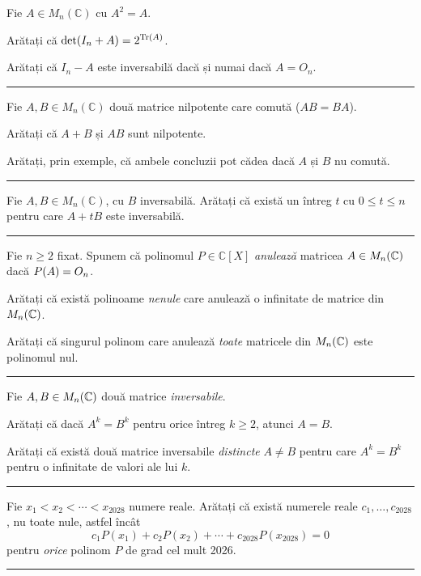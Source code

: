 Fie $A\in M_n(\mathbb{C})$ cu $A^2=A$.
\begin{parti}
  \item Arătați că $\det(I_n+A)=2^{\operatorname{Tr}(A)}$.
  \item Arătați că $I_n-A$ este inversabilă dacă și numai dacă $A=O_n$.
\end{parti}
\vspace{1mm}\hrule

Fie $A,B\in M_n(\mathbb{C})$ două matrice nilpotente care comută ($AB=BA$).
\begin{parti}
  \item Arătați că $A+B$ și $AB$ sunt nilpotente.
  \item Arătați, prin exemple, că ambele concluzii pot cădea dacă $A$ și $B$ nu comută.
\end{parti}
\vspace{1mm}\hrule

Fie $A,B\in M_n(\mathbb{C})$, cu $B$ inversabilă. Arătați că există un întreg $t$ cu $0\le t\le n$ pentru care $A+tB$ este inversabilă.
\vspace{1mm}\hrule

Fie $n\ge2$ fixat. Spunem că polinomul $P\in\mathbb{C}[X]$ \emph{anulează} matricea $A\in M_n(\mathbb{C})$ dacă $P(A)=O_n$.
\begin{parti}
  \item Arătați că există polinoame \emph{nenule} care anulează o infinitate de matrice din $M_n(\mathbb{C})$.
  \item Arătați că singurul polinom care anulează \emph{toate} matricele din $M_n(\mathbb{C})$ este polinomul nul.
\end{parti}
\vspace{1mm}\hrule

Fie $A,B\in M_n(\mathbb{C})$ două matrice \emph{inversabile}.
\begin{parti}
  \item Arătați că dacă $A^k=B^k$ pentru orice întreg $k\ge2$, atunci $A=B$.
  \item Arătați că există două matrice inversabile \emph{distincte} $A\neq B$ pentru care $A^k=B^k$ pentru o infinitate de valori ale lui $k$.
\end{parti}
\vspace{1mm}\hrule

Fie $x_1 < x_2 < \cdots < x_{2028}$ numere reale. Arătați că există numerele reale $c_1,\ldots,c_{2028}$, nu toate nule, astfel încât
\[
c_1P(x_1) + c_2P(x_2) + \cdots + c_{2028}P(x_{2028}) = 0
\]
pentru \emph{orice} polinom $P$ de grad cel mult 2026.
\vspace{1mm}\hrule

